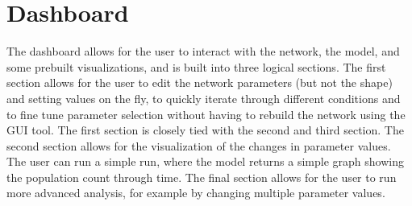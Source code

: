 \section{Dashboard}
The dashboard allows for the user to interact with the network, the model, and some prebuilt visualizations, and is built into three logical sections. 
The first section allows for the user to edit the network parameters (but not the shape) and setting values on the fly, to quickly iterate through different conditions and to fine tune parameter selection without having to rebuild the network using the GUI tool. 
The first section is closely tied with the second and third section. 
The second section allows for the visualization of the changes in parameter values. 
The user can run a simple run, where the model returns a simple graph showing the population count through time. 
The final section allows for the user to run more advanced analysis, for example by changing multiple parameter values. 

